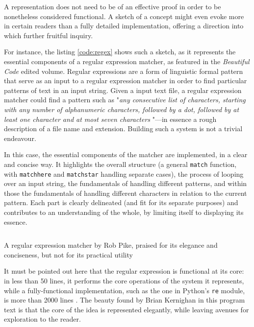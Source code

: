 A representation does not need to be of an effective proof in order to be nonetheless considered functional. A sketch of a concept might even evoke more in certain readers than a fully detailed implementation, offering a direction into which further fruitful inquiry.

For instance, the listing \ref{code:regex} shows such a sketch, as it represents the essential components of a regular expression matcher, as featured in the \emph{Beautiful Code} edited volume. Regular expressions are a form of linguistic formal pattern that serve as an input to a regular expression matcher in order to find particular patterns of text in an input string. Given a input text file, a regular expression matcher could find a pattern such as "\emph{any consecutive list of characters, starting with any number of alphanumeric characters, followed by a dot, followed by at least one character and at most seven characters }"—in essence a rough description of a file name and extension. Building such a system is not a trivial endeavour.

In this case, the essential components of the matcher are implemented, in a clear and concise way. It highlights the overall structure (a general \lstinline{match} function, with \lstinline{matchhere} and \lstinline{matchstar} handling separate cases), the process of looping over an input string, the fundamentals of handling different patterns, and within those the fundamentals of handling different characters in relation to the current pattern. Each part is clearly delineated (and fit for its separate purposes) and contributes to an understanding of the whole, by limiting itself to displaying its essence.

\begin{listing}
    \inputminted{c}{./corpus/regex.c}
    \caption{A regular expression matcher by Rob Pike, praised for its elegance and conciseness, but not for its practical utility \citep{oram_beautiful_2007}}
    \label{code:regex}
\end{listing}

It must be pointed out here that the regular expression is functional at its core: in less than 50 lines, it performs the core operations of the system it represents, while a fully-functional implementation, such as the one in Python's \lstinline{re} module, is more than 2000 lines \citep{secretlabsab_parser_2001}. The beauty found by Brian Kernighan in this program text is that the core of the idea is represented elegantly, while leaving avenues for exploration to the reader.

